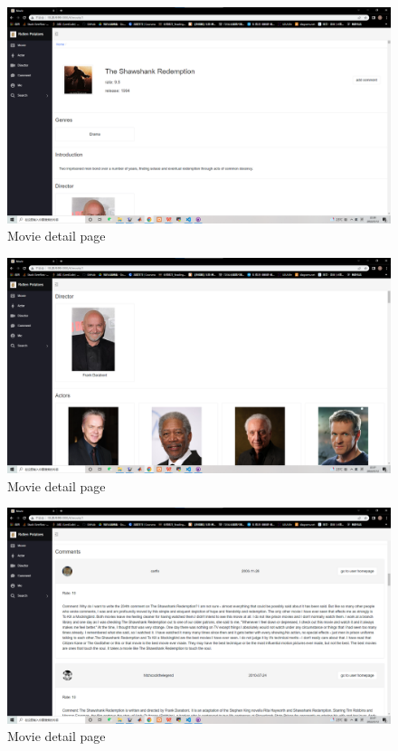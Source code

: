 \begin{CJK*}{UTF8}{gbsn}
    \begin{figure}[htbp]
    \centering
    \includegraphics[width=1\textwidth]{res_movie2.png}
    \caption{Movie detail page}
    \end{figure}
    
    \begin{figure}[htbp]
    \centering
    \includegraphics[width=1\textwidth]{res_movie3.png}
    \caption{Movie detail page}
    \end{figure}
    
    \begin{figure}[htbp]
    \centering
    \includegraphics[width=1\textwidth]{res_movie4.png}
    \caption{Movie detail page}
    \end{figure}
    

\end{CJK*}
